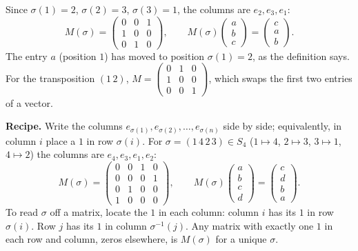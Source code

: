 \documentclass[11pt]{report}
\begin{document}
\begin{exbox}[{$M(\sigma)$ for $\sigma = (1\,2\,3)$}]\label{ex:m-sigma-sigma-1-2-3}
Since $\sigma(1) = 2$, $\sigma(2) = 3$, $\sigma(3) = 1$, the columns are $e_2, e_3, e_1$:
\[ M(\sigma) = \begin{pmatrix} 0 & 0 & 1 \\ 1 & 0 & 0 \\ 0 & 1 & 0 \end{pmatrix}, \qquad M(\sigma) \begin{pmatrix} a \\ b \\ c \end{pmatrix} = \begin{pmatrix} c \\ a \\ b \end{pmatrix}. \]
The entry $a$ (position $1$) has moved to position $\sigma(1) = 2$, as the definition says. For the transposition $(1\,2)$, $M = \begin{pmatrix} 0 & 1 & 0 \\ 1 & 0 & 0 \\ 0 & 0 & 1 \end{pmatrix}$, which swaps the first two entries of a vector.

\textbf{Recipe.} Write the columns $e_{\sigma(1)}, e_{\sigma(2)}, \ldots, e_{\sigma(n)}$ side by side; equivalently, in column $i$ place a $1$ in row $\sigma(i)$. For $\sigma = (1\,4\,2\,3) \in S_4$ ($1 \mapsto 4$, $2 \mapsto 3$, $3 \mapsto 1$, $4 \mapsto 2$) the columns are $e_4, e_3, e_1, e_2$:
\[ M(\sigma) = \begin{pmatrix} 0 & 0 & 1 & 0 \\ 0 & 0 & 0 & 1 \\ 0 & 1 & 0 & 0 \\ 1 & 0 & 0 & 0 \end{pmatrix}, \qquad M(\sigma)\begin{pmatrix} a \\ b \\ c \\ d \end{pmatrix} = \begin{pmatrix} c \\ d \\ b \\ a \end{pmatrix}. \]
To read $\sigma$ off a matrix, locate the $1$ in each column: column $i$ has its $1$ in row $\sigma(i)$. Row $j$ has its $1$ in column $\sigma^{-1}(j)$. Any matrix with exactly one $1$ in each row and column, zeros elsewhere, is $M(\sigma)$ for a unique $\sigma$.
\end{exbox}
\end{document}
